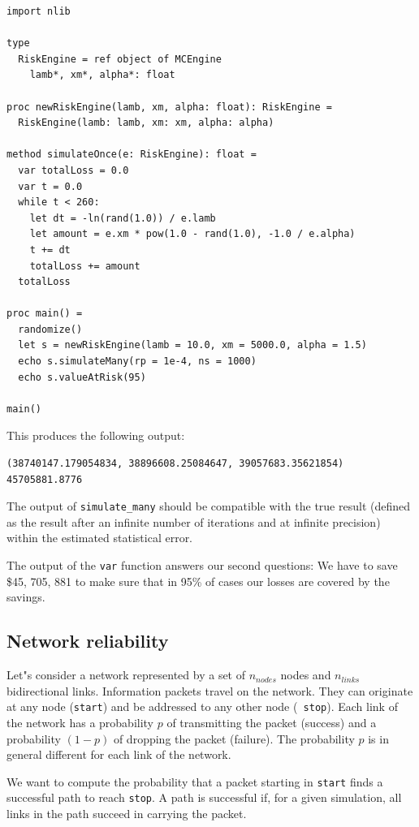 \documentclass[justified, sixbynine]{tufte-book}
\def\ft{\small\tt}
\theoremstyle{plain}%
\newtheorem * {corollary}{Corollary}
\theoremstyle{definition}
\theoremstyle{remark}
\newtheorem * {remark}{Remark}
\newtheorem * {note}{Note}
\begin{document}
\begin{fullwidth}
\begin{lstlisting}[caption={in file: {\ft risk.nim}}]
import nlib

type
  RiskEngine = ref object of MCEngine
    lamb*, xm*, alpha*: float

proc newRiskEngine(lamb, xm, alpha: float): RiskEngine =
  RiskEngine(lamb: lamb, xm: xm, alpha: alpha)

method simulateOnce(e: RiskEngine): float =
  var totalLoss = 0.0
  var t = 0.0
  while t < 260:
    let dt = -ln(rand(1.0)) / e.lamb
    let amount = e.xm * pow(1.0 - rand(1.0), -1.0 / e.alpha)
    t += dt
    totalLoss += amount
  totalLoss

proc main() =
  randomize()
  let s = newRiskEngine(lamb = 10.0, xm = 5000.0, alpha = 1.5)
  echo s.simulateMany(rp = 1e-4, ns = 1000)
  echo s.valueAtRisk(95)

main()
\end{lstlisting}

This produces the following output:

\begin{lstlisting}
(38740147.179054834, 38896608.25084647, 39057683.35621854)
45705881.8776
\end{lstlisting}

The output of {\ft simulate\_many} should be compatible with the true result (defined as the result after an infinite number of iterations and at infinite precision) within the estimated statistical error.

The output of the {\ft var} function answers our second questions: We have to save \$45, 705, 881 to make sure that in 95\% of cases our losses are covered by the savings.


\subsection{Network reliability}

Let"s consider a network represented by a set of $n_{nodes}$ nodes and $%
n_{links}$ bidirectional links. Information
packets travel on the network. They can
originate at any node ({\ft start}) and be addressed to any other node ({\ft %
stop}). Each link of the network has a probability $p$ of transmitting the
packet (success) and a probability $(1-p)$ of dropping the packet (failure).
The probability $p$ is in general different for each link of the network.

We want to compute the probability that a packet
starting in {\ft start} finds a successful path to reach {\ft stop}. A path
is successful if, for a given simulation, all links in the path succeed in
carrying the packet.


\end{fullwidth}
\end{document}
